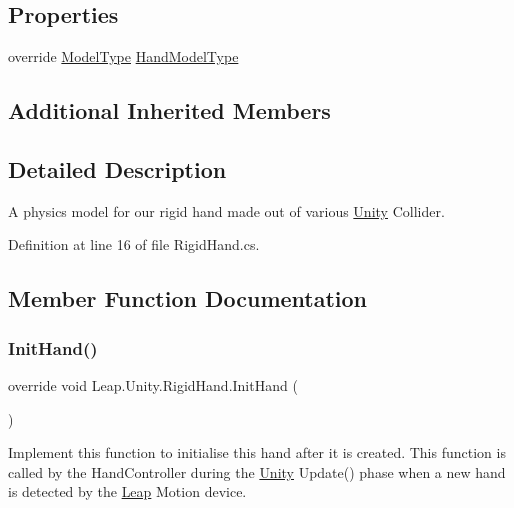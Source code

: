 \subsection*{Properties}
\begin{DoxyCompactItemize}
\item 
override \mbox{\hyperlink{namespace_leap_1_1_unity_a186e5eb0a2b743f1f6b79346f0ab8ad0}{Model\+Type}} \mbox{\hyperlink{class_leap_1_1_unity_1_1_rigid_hand_a27e950ca795a12ee3b52dcf5de8e5032}{Hand\+Model\+Type}}
\end{DoxyCompactItemize}
\subsection*{Additional Inherited Members}


\subsection{Detailed Description}
A physics model for our rigid hand made out of various \mbox{\hyperlink{namespace_leap_1_1_unity}{Unity}} Collider. 

Definition at line 16 of file Rigid\+Hand.\+cs.



\subsection{Member Function Documentation}
\mbox{\label{class_leap_1_1_unity_1_1_rigid_hand_a7e76c7f3a3128c1a2e0343a43e177efa}} 
\subsubsection{\texorpdfstring{InitHand()}{InitHand()}}
{\footnotesize\ttfamily override void Leap.\+Unity.\+Rigid\+Hand.\+Init\+Hand (\begin{DoxyParamCaption}{ }\end{DoxyParamCaption})\hspace{0.3cm}{\ttfamily [virtual]}}

Implement this function to initialise this hand after it is created. This function is called by the Hand\+Controller during the \mbox{\hyperlink{namespace_leap_1_1_unity}{Unity}} Update() phase when a new hand is detected by the \mbox{\hyperlink{namespace_leap_1_1_unity_1_1_leap}{Leap}} Motion device. 


